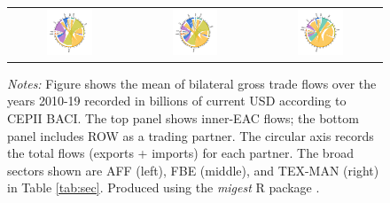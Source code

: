 \documentclass[a4paper]{article}
\begin{document}
\begin{figure}[h!]
{\begin{tabular}{ccc}
\includegraphics[width=0.4\textwidth, trim= {0.85cm 0.8cm 1.1cm 1cm}, clip]{"Figures/BACI_MIG_AGR_2010_19_ROW.pdf"} & \includegraphics[width=0.4\textwidth, trim= {0.85cm 0.8cm 1.1cm 1cm}, clip]{"Figures/BACI_MIG_FBE_2010_19_ROW.pdf"} &
\includegraphics[width=0.4\textwidth, trim= {0.85cm 0.8cm 1cm 1cm}, clip]{"Figures/BACI_MIG_MAN_2010_19_ROW.pdf"} \\
\end{tabular}
}
\raggedright
\scriptsize 
\emph{Notes:} Figure shows the mean of bilateral gross trade flows over the years 2010-19 recorded in billions of current USD according to CEPII BACI. The top panel shows inner-EAC flows; the bottom panel includes ROW as a trading partner. The circular axis records the total flows (exports + imports) for each partner. The broad sectors shown are AFF (left), FBE (middle), and TEX-MAN (right) in Table \ref{tab:sec}. Produced using the \emph{migest} R package \citep{rmigest}.
\end{figure}
\FloatBarrier
\end{document}
